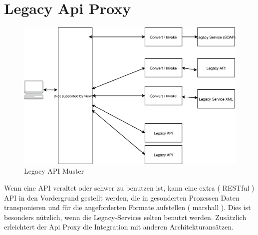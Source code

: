 \documentclass[
12pt,
english,
ngerman,
headsepline,
twoside,
openright,
numbers=noenddot,version=first
]{scrreprt}
\begin{document}
\section{Legacy Api Proxy}
\begin{figure}[H]
	\centering
	\includegraphics[scale=0.60]{./pics/legacy-api-proxy.eps}
	\caption{Legacy API Muster}
	\label{legacy-api-proxy}
\end{figure}
	
Wenn eine \acrshort{API} veraltet oder schwer zu benutzen ist, kann eine extra ( RESTful ) \acrshort{API} in den Vordergrund gestellt werden, die in gesonderten Prozessen Daten transponieren und für die angeforderten Formate aufstellen ( marshall ). Dies ist besonders nützlich, wenn die Legacy-Services selten benutzt werden. Zusätzlich erleichtert der Api Proxy die Integration mit anderen Architekturansätzen.
\\
\\
\end{document}
